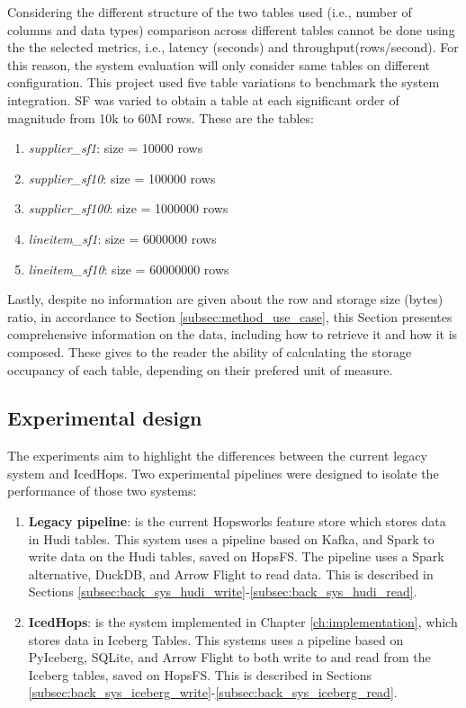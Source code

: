 Considering the different structure of the two tables used (i.e., number of columns and data types) comparison across different tables cannot be done using the the selected metrics, i.e., latency (seconds) and throughput(rows/second). For this reason, the system evaluation will only consider same tables on different configuration. This project used five table variations to benchmark the system integration. \gls{SF} was varied to obtain a table at each significant order of magnitude from 10k to 60M rows. These are the tables:
\begin{enumerate}
    \item \textit{supplier\_sf1}: size = 10000 rows
    \item \textit{supplier\_sf10}: size = 100000 rows
    \item \textit{supplier\_sf100}: size = 1000000 rows
    \item \textit{lineitem\_sf1}: size = 6000000 rows
    \item \textit{lineitem\_sf10}: size = 60000000 rows
\end{enumerate}

Lastly, despite no information are given about the row and storage size (bytes) ratio, in accordance to Section \ref{subsec:method_use_case}, this Section presentes comprehensive information on the data, including how to retrieve it and how it is composed. These gives to the reader the ability of calculating the storage occupancy of each table, depending on their prefered unit of measure.



\subsection{Experimental design}
\label{subsec:experimental_design}

The experiments aim to highlight the differences between the current legacy system and IcedHops. Two experimental pipelines were designed to isolate the performance of those two systems:
\begin{enumerate}
  \item \textbf{Legacy pipeline}: is the current Hopsworks feature store which stores data in Hudi tables. This system uses a pipeline based on Kafka, and Spark to write data on the Hudi tables, saved on \gls{HopsFS}. The pipeline uses a Spark alternative, DuckDB, and Arrow Flight to read data. This is described in Sections \ref{subsec:back_sys_hudi_write}-\ref{subsec:back_sys_hudi_read}.
  \item \textbf{IcedHops}: is the system implemented in Chapter \ref{ch:implementation}, which stores data in Iceberg Tables. This systems uses a pipeline based on PyIceberg, SQLite, and Arrow Flight to both write to and read from the Iceberg tables, saved on \gls{HopsFS}. This is described in Sections \ref{subsec:back_sys_iceberg_write}-\ref{subsec:back_sys_iceberg_read}.
\end{enumerate}

